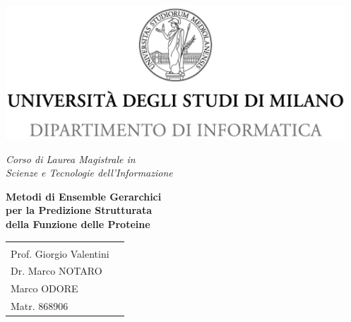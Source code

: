 \documentclass[12pt]{report}
\begin{document}
\begin{titlepage}
  \begin{center}
    \includegraphics[height=5.0cm]{./images/minerva_2013_DI.jpg}
    
    \vspace*{.4cm}
    {\Large 
      \emph{Corso di Laurea Magistrale in\\[.3cm]
        Scienze e Tecnologie dell'Informazione}
    }
    \vfill
    \begin{LARGE}
      \textbf{Metodi di Ensemble Gerarchici \\[.2cm] per la Predizione Strutturata \\[.3cm]della Funzione delle Proteine}
    \end{LARGE}
    
    \vfill
    \begin{minipage}{.99\linewidth}
      \begin{tabular}{l r}
        \begin{minipage}{.4\linewidth}
          \begin{flushleft}
            {\large
              RELATORE\\[.3cm]
              Prof. Giorgio Valentini
            }

            {\large
              CORRELATORE\\[.3cm]
               Dr. Marco NOTARO
            }
          \end{flushleft}
        \end{minipage}
        &
        \begin{minipage}{.6\linewidth}
          \begin{flushright}
            {\large
              TESI DI LAUREA DI\\[.3cm]
              Marco ODORE\\[.45cm]
              Matr. 868906
            }
          \end{flushright}
        \end{minipage}
      \end{tabular}
    \end{minipage}
    

\end{center}
\end{titlepage}
\end{document}
